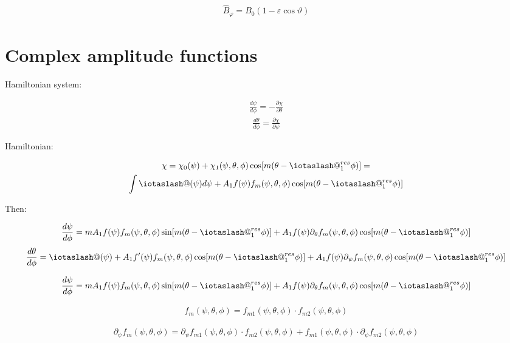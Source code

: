 \documentclass[11pt,a4paper,oneside]{article}
\makeatletter
\newcommand{\iotaslash}{{\mathpalette\iotaslash@\relax}}
\newcommand{\iotaslash@}[2]{
  \raisebox{-0.6\height}[0pt][0pt]{%
    \rotatebox[origin=Bl]{15}{$\m@th#1{\mkern-1mu\mathchar'26}$}%
  }%
  \mkern-9.5mu\nonscript\mkern-1mu
  \iota
  \mkern1mu
}
\makeatother
\begin{document}
\begin{align}
\hat{B}_{\varphi}=B_0 (1-\varepsilon \cos{\vartheta})
\end{align}

\section{Complex amplitude functions}

Hamiltonian system:

\begin{align}
\frac{d \psi}{d\phi}=-\frac{\partial \chi}{\partial\theta}
\end{align}
\begin{align}
\frac{d \theta}{d\phi}=\frac{\partial \chi}{\partial\psi}
\end{align}

Hamiltonian:

\begin{multline}
\chi=\chi_0(\psi)+\chi_1(\psi,\theta,\phi)\cos[m(\theta-\iotaslash^{res}_1\phi)]=\\
\int\iotaslash(\psi)d\psi+A_1f(\psi)f_m(\psi,\theta,\phi)\cos[m(\theta-\iotaslash^{res}_1\phi)]
\end{multline}

Then:

\begin{align}
\frac{d \psi}{d\phi}=mA_1f(\psi)f_m(\psi,\theta,\phi)\sin[m(\theta-\iotaslash^{res}_1\phi)]+A_1f(\psi)\partial_\theta f_m(\psi,\theta,\phi)\cos[m(\theta-\iotaslash^{res}_1\phi)]
\end{align}
\begin{align}
\frac{d \theta}{d\phi}=\iotaslash(\psi)+A_1f'(\psi)f_m(\psi,\theta,\phi)\cos[m(\theta-\iotaslash^{res}_1\phi)]+A_1f(\psi)\partial_\psi f_m(\psi,\theta,\phi)\cos[m(\theta-\iotaslash^{res}_1\phi)]
\end{align}

\begin{align}
\frac{d \psi}{d\phi}=mA_1f(\psi)f_m(\psi,\theta,\phi)\sin[m(\theta-\iotaslash^{res}_1\phi)]+A_1f(\psi)\partial_\theta f_m(\psi,\theta,\phi)\cos[m(\theta-\iotaslash^{res}_1\phi)]
\end{align}

\begin{align}
 f_m(\psi,\theta,\phi)=f_{m1}(\psi,\theta,\phi)\cdot f_{m2}(\psi,\theta,\phi)
\end{align}

\begin{align}
 \partial_\psi f_m(\psi,\theta,\phi)= \partial_\psi f_{m1}(\psi,\theta,\phi)\cdot f_{m2}(\psi,\theta,\phi)+f_{m1}(\psi,\theta,\phi)\cdot  \partial_\psi f_{m2}(\psi,\theta,\phi)
\end{align}
\end{document}
